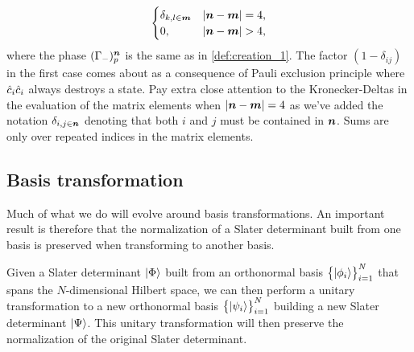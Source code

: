 \begin{lemma}
\begin{gather}
\begin{cases}
                        \delta_{k, l \in \boldsymbol{m}}
                        & \abs{\boldsymbol{n} - \boldsymbol{m}} = 4,
                        \\
                        0, & \abs{\boldsymbol{n} - \boldsymbol{m}} > 4,
                    \end{cases}
                \end{gather}
                where the phase $(\Gamma_{-})^{\boldsymbol{n}}_{p}$ is the same as in
                \autoref{def:creation_1}.
                The factor $(1 - \delta_{ij})$ in the first case comes about as
                a consequence of Pauli exclusion principle where
                $\hat{c}_{i}\hat{c}_{i}$ always destroys a state.
                Pay extra close attention to the Kronecker-Deltas in the
                evaluation of the matrix elements when $\abs{\boldsymbol{n} - \boldsymbol{m}}
                = 4$ as we've added the notation $\delta_{i, j \in \boldsymbol{n}}$
                denoting that both $i$ and $j$ must be contained in $\boldsymbol{n}$.
                Sums are only over repeated indices in the matrix elements.
            \end{lemma}

        \subsection{Basis transformation}
            Much of what we do will evolve around basis transformations.
            An important result is therefore that the normalization of a Slater
            determinant built from one basis is preserved when transforming to
            another basis.
            \begin{lemma}
                Given a Slater determinant $\ket{\Phi}$ built from an
                orthonormal basis $\left\{ \ket{\phi_i} \right\}_{i = 1}^{N}$ that spans
                the $N$-dimensional Hilbert space, we can then perform a unitary
                transformation to a new orthonormal basis
                $\left\{ \ket{\psi_i} \right\}_{i = 1}^{N}$ building a new Slater
                determinant $\ket{\Psi}$.
                This unitary transformation will then preserve the normalization
                of the original Slater determinant.
            \end{lemma}

